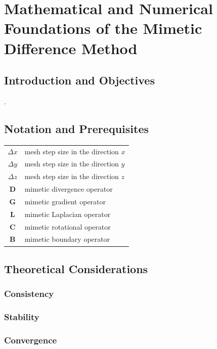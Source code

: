 \chapter{Mathematical and Numerical Foundations of the Mimetic Difference Method}

\section{Introduction and Objectives}

\cite{daVeiga2014}.

\section{Notation and Prerequisites}

\begin{table}[ht!]
	\centering
	\begin{tabular}{cl}
		$\Delta x$  & mesh step size in the direction $x$ \\
		$\Delta y$  & mesh step size in the direction $y$ \\
		$\Delta z$  & mesh step size in the direction $z$ \\
		$\symbf{D}$ & mimetic divergence operator         \\
		$\symbf{G}$ & mimetic gradient operator           \\
		$\symbf{L}$ & mimetic Laplacian operator          \\
		$\symbf{C}$ & mimetic rotational operator         \\
		$\symbf{B}$ & mimetic boundary operator
	\end{tabular}
\end{table}

\section{Theoretical Considerations}

\subsection{Consistency}

\subsection{Stability}

\subsection{Convergence}

